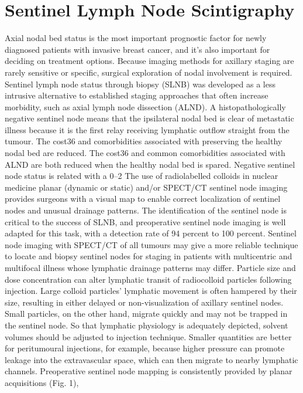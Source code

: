 \documentclass{article}
\begin{document}
\section{Sentinel Lymph Node Scintigraphy}
Axial nodal bed status is the most important prognostic factor for newly diagnosed patients 
with invasive breast cancer, and it's also important for deciding on treatment options. 
Because imaging methods for axillary staging are rarely sensitive or specific, surgical 
exploration of nodal involvement is required. Sentinel lymph node status through biopsy 
(SLNB) was developed as a less intrusive alternative to established staging approaches that 
often increase morbidity, such as axial lymph node dissection (ALND). A histopathologically 
negative sentinel node means that the ipsilateral nodal bed is clear of metastatic illness 
because it is the first relay receiving lymphatic outflow straight from the tumour. The cost36 
and comorbidities associated with preserving the healthy nodal bed are reduced. The cost36 
and common comorbidities associated with ALND are both reduced when the healthy nodal 
bed is spared. Negative sentinel node status is related with a 0–2%
The use of radiolabelled colloids in nuclear medicine planar (dynamic or static) and/or 
SPECT/CT sentinel node imaging provides surgeons with a visual map to enable correct 
localization of sentinel nodes and unusual drainage patterns. The identification of the 
sentinel node is critical to the success of SLNB, and preoperative sentinel node imaging is 
well adapted for this task, with a detection rate of 94 percent to 100 percent. Sentinel node 
imaging with SPECT/CT of all tumours may give a more reliable technique to locate and 
biopsy sentinel nodes for staging in patients with multicentric and multifocal illness whose 
lymphatic drainage patterns may differ.
Particle size and dose concentration can alter lymphatic transit of radiocolloid particles 
following injection. Large colloid particles' lymphatic movement is often hampered by their 
size, resulting in either delayed or non-visualization of axillary sentinel nodes. Small 
particles, on the other hand, migrate quickly and may not be trapped in the sentinel node.
So that lymphatic physiology is adequately depicted, solvent volumes should be adjusted to 
injection technique. Smaller quantities are better for peritumoural injections, for example, 
because higher pressure can promote leakage into the extravascular space, which can then 
migrate to nearby lymphatic channels.
Preoperative sentinel node mapping is consistently provided by planar acquisitions (Fig. 1), 
\end{document}
